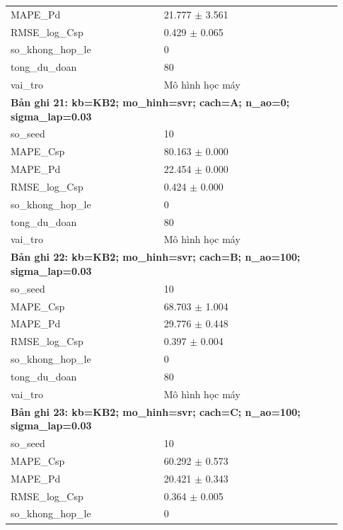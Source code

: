 \begin{longtable}{p{0.43\linewidth}p{0.50\linewidth}}
MAPE\_\allowbreak Pd & 21.777 $\pm$ 3.561 \\
RMSE\_\allowbreak log\_\allowbreak Csp & 0.429 $\pm$ 0.065 \\
so\_\allowbreak khong\_\allowbreak hop\_\allowbreak le & 0 \\
tong\_\allowbreak du\_\allowbreak doan & 80 \\
vai\_\allowbreak tro & Mô hình học máy \\
\midrule
\multicolumn{2}{p{0.95\linewidth}}{\textbf{Bản ghi 21: kb=KB2; mo\_hinh=svr; cach=A; n\_ao=0; sigma\_lap=0.03}} \\
so\_\allowbreak seed & 10 \\
MAPE\_\allowbreak Csp & 80.163 $\pm$ 0.000 \\
MAPE\_\allowbreak Pd & 22.454 $\pm$ 0.000 \\
RMSE\_\allowbreak log\_\allowbreak Csp & 0.424 $\pm$ 0.000 \\
so\_\allowbreak khong\_\allowbreak hop\_\allowbreak le & 0 \\
tong\_\allowbreak du\_\allowbreak doan & 80 \\
vai\_\allowbreak tro & Mô hình học máy \\
\midrule
\multicolumn{2}{p{0.95\linewidth}}{\textbf{Bản ghi 22: kb=KB2; mo\_hinh=svr; cach=B; n\_ao=100; sigma\_lap=0.03}} \\
so\_\allowbreak seed & 10 \\
MAPE\_\allowbreak Csp & 68.703 $\pm$ 1.004 \\
MAPE\_\allowbreak Pd & 29.776 $\pm$ 0.448 \\
RMSE\_\allowbreak log\_\allowbreak Csp & 0.397 $\pm$ 0.004 \\
so\_\allowbreak khong\_\allowbreak hop\_\allowbreak le & 0 \\
tong\_\allowbreak du\_\allowbreak doan & 80 \\
vai\_\allowbreak tro & Mô hình học máy \\
\midrule
\multicolumn{2}{p{0.95\linewidth}}{\textbf{Bản ghi 23: kb=KB2; mo\_hinh=svr; cach=C; n\_ao=100; sigma\_lap=0.03}} \\
so\_\allowbreak seed & 10 \\
MAPE\_\allowbreak Csp & 60.292 $\pm$ 0.573 \\
MAPE\_\allowbreak Pd & 20.421 $\pm$ 0.343 \\
RMSE\_\allowbreak log\_\allowbreak Csp & 0.364 $\pm$ 0.005 \\
so\_\allowbreak khong\_\allowbreak hop\_\allowbreak le & 0 \\

\end{longtable}
